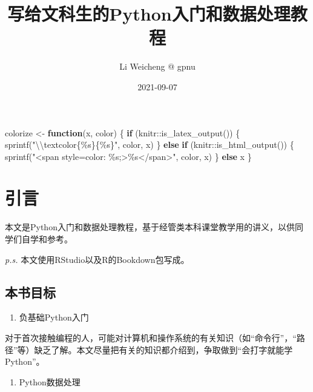\documentclass[
]{book}
\title{写给文科生的Python入门和数据处理教程}
\author{Li Weicheng @ gpnu}
\date{2021-09-07}
\newenvironment{Shaded}{\begin{snugshade}}{\end{snugshade}}
\newcommand{\ControlFlowTok}[1]{\textcolor[rgb]{0.13,0.29,0.53}{\textbf{#1}}}
\newcommand{\FunctionTok}[1]{\textcolor[rgb]{0.00,0.00,0.00}{#1}}
\newcommand{\NormalTok}[1]{#1}
\newcommand{\OtherTok}[1]{\textcolor[rgb]{0.56,0.35,0.01}{#1}}
\newcommand{\SpecialCharTok}[1]{\textcolor[rgb]{0.00,0.00,0.00}{#1}}
\newcommand{\StringTok}[1]{\textcolor[rgb]{0.31,0.60,0.02}{#1}}
\providecommand{\tightlist}{%
  \setlength{\itemsep}{0pt}\setlength{\parskip}{0pt}}
\begin{document}
\maketitle

{
\setcounter{tocdepth}{1}
\tableofcontents
}
\begin{Shaded}
\begin{Highlighting}[]
\NormalTok{colorize }\OtherTok{\textless{}{-}} \ControlFlowTok{function}\NormalTok{(x, color) \{}
  \ControlFlowTok{if}\NormalTok{ (knitr}\SpecialCharTok{::}\FunctionTok{is\_latex\_output}\NormalTok{()) \{}
    \FunctionTok{sprintf}\NormalTok{(}\StringTok{"}\SpecialCharTok{\textbackslash{}\textbackslash{}}\StringTok{textcolor\{\%s\}\{\%s\}"}\NormalTok{, color, x)}
\NormalTok{  \} }\ControlFlowTok{else} \ControlFlowTok{if}\NormalTok{ (knitr}\SpecialCharTok{::}\FunctionTok{is\_html\_output}\NormalTok{()) \{}
    \FunctionTok{sprintf}\NormalTok{(}\StringTok{"\textless{}span style=\textquotesingle{}color: \%s;\textquotesingle{}\textgreater{}\%s\textless{}/span\textgreater{}"}\NormalTok{, color,}
\NormalTok{      x)}
\NormalTok{  \} }\ControlFlowTok{else}\NormalTok{ x}
\NormalTok{\}}
\end{Highlighting}
\end{Shaded}

\hypertarget{ux5f15ux8a00}{%
\chapter{引言}\label{ux5f15ux8a00}}

本文是Python入门和数据处理教程，基于经管类本科课堂教学用的讲义，以供同学们自学和参考。

\emph{p.s.} 本文使用RStudio以及R的Bookdown包写成。

\hypertarget{ux672cux4e66ux76eeux6807}{%
\section{本书目标}\label{ux672cux4e66ux76eeux6807}}

\begin{enumerate}
\def\labelenumi{\arabic{enumi}.}
\tightlist
\item
  负基础Python入门
\end{enumerate}

对于首次接触编程的人，可能对计算机和操作系统的有关知识（如``命令行''，``路径''等）缺乏了解。本文尽量把有关的知识都介绍到，争取做到``会打字就能学Python''。

\begin{enumerate}
\def\labelenumi{\arabic{enumi}.}
\setcounter{enumi}{1}
\tightlist
\item
  Python数据处理
\end{enumerate}
\end{document}
